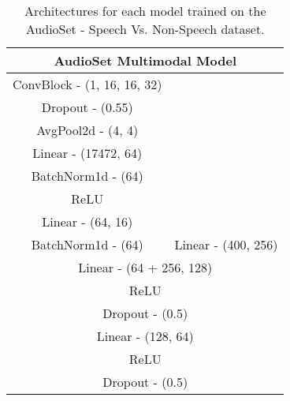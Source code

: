 \begin{table}[h!]
    \footnotesize
    \centering
    \caption{Architectures for each model trained on the AudioSet -  Speech Vs. Non-Speech dataset.}
    \label{tab:audioset}
    \begin{minipage}[t]{0.4\textwidth}
        \centering
        \vspace{0pt} %
        
        \begin{tabular}{clllllllllll}
            \hline
            \multicolumn{12}{c}{\textbf{AudioSet Multimodal Model}}                  \\ \hline
            \multicolumn{6}{c|}{ConvBlock - (1, 16, 16, 32)}   & \multicolumn{6}{l}{\multirow{7}{*}{}} \\ \cline{1-6}
            \multicolumn{6}{c|}{Dropout - (0.55)}     & \multicolumn{6}{l}{}                  \\ \cline{1-6}
            \multicolumn{6}{c|}{AvgPool2d - (4, 4)}   & \multicolumn{6}{l}{}                  \\ \cline{1-6}
            \multicolumn{6}{c|}{Linear - (17472, 64)}      & \multicolumn{6}{l}{}                  \\ \cline{1-6}
            \multicolumn{6}{c|}{BatchNorm1d - (64)} & \multicolumn{6}{l}{}                  \\ \cline{1-6}
            \multicolumn{6}{c|}{ReLU}        & \multicolumn{6}{l}{}                  \\ \cline{1-6}
            \multicolumn{6}{c|}{Linear - (64, 16)}      & \multicolumn{6}{l}{}                  \\ \hline
            \multicolumn{6}{c|}{BatchNorm1d - (64)} & \multicolumn{6}{c}{Linear - (400, 256)}            \\ \hline
            \multicolumn{12}{c}{Linear - (64 + 256, 128)}                                              \\ \hline
            \multicolumn{12}{c}{ReLU}                                                \\ \hline
            \multicolumn{12}{c}{Dropout - (0.5)}                                             \\ \hline
            \multicolumn{12}{c}{Linear - (128, 64)}                                              \\ \hline
            \multicolumn{12}{c}{ReLU}                                                \\ \hline
            \multicolumn{12}{c}{Dropout - (0.5)}                                             \\ \hline

\end{tabular}
\end{minipage}
\end{table}
